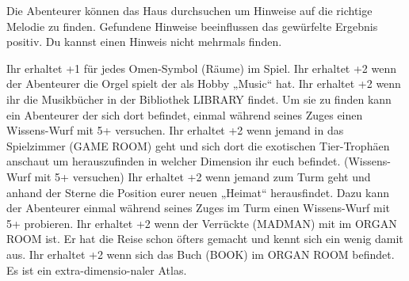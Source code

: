 Die Abenteurer können das Haus durchsuchen um Hinweise auf die richtige Melodie zu finden. Gefundene Hinweise beeinflussen das gewürfelte Ergebnis positiv. Du kannst einen Hinweis nicht mehrmals finden.
  \begin{itemize}
    \bitem Ihr erhaltet +1 für jedes Omen-Symbol (Räume) im Spiel.
    \bitem Ihr erhaltet +2 wenn der Abenteurer die Orgel spielt der als Hobby „Music“ hat.
    \bitem Ihr erhaltet +2 wenn ihr die Musikbücher in der Bibliothek LIBRARY findet. Um sie zu finden kann ein Abenteurer der sich dort befindet, einmal während seines Zuges einen Wissens-Wurf mit 5+ versuchen.
    \bitem Ihr erhaltet +2 wenn jemand in das Spielzimmer (GAME ROOM) geht und sich dort die exotischen Tier-Trophäen anschaut um herauszufinden in welcher Dimension ihr euch befindet.
        (Wissens-Wurf mit 5+ versuchen)
    \bitem Ihr erhaltet +2 wenn jemand zum Turm geht und anhand der Sterne die Position eurer neuen „Heimat“ herausfindet. Dazu kann der Abenteurer einmal während seines Zuges im Turm einen Wissens-Wurf mit 5+ probieren.
    \bitem Ihr erhaltet +2 wenn der Verrückte (MADMAN) mit im ORGAN ROOM ist. Er hat die Reise schon öfters gemacht und kennt sich ein wenig damit aus.
    \bitem Ihr erhaltet +2 wenn sich das Buch (BOOK) im ORGAN ROOM befindet. Es ist ein extra-dimensio-naler Atlas.
    \end{itemize}


